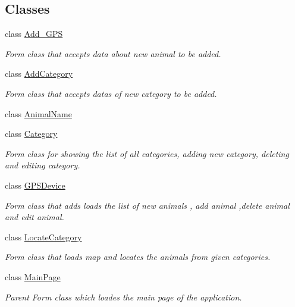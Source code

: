\subsection*{Classes}
\begin{DoxyCompactItemize}
\item 
class \hyperlink{classWildlifeTrackingApp_1_1Add__GPS}{Add\+\_\+\+G\+PS}
\begin{DoxyCompactList}\small\item\em Form class that accepts data about new animal to be added. \end{DoxyCompactList}\item 
class \hyperlink{classWildlifeTrackingApp_1_1AddCategory}{Add\+Category}
\begin{DoxyCompactList}\small\item\em Form class that accepts datas of new category to be added. \end{DoxyCompactList}\item 
class \hyperlink{classWildlifeTrackingApp_1_1AnimalName}{Animal\+Name}
\item 
class \hyperlink{classWildlifeTrackingApp_1_1Category}{Category}
\begin{DoxyCompactList}\small\item\em Form class for showing the list of all categories, adding new category, deleting and editing category. \end{DoxyCompactList}\item 
class \hyperlink{classWildlifeTrackingApp_1_1GPSDevice}{G\+P\+S\+Device}
\begin{DoxyCompactList}\small\item\em Form class that adds loads the list of new animals , add animal ,delete animal and edit animal. \end{DoxyCompactList}\item 
class \hyperlink{classWildlifeTrackingApp_1_1LocateCategory}{Locate\+Category}
\begin{DoxyCompactList}\small\item\em Form class that loads map and locates the animals from given categories. \end{DoxyCompactList}\item 
class \hyperlink{classWildlifeTrackingApp_1_1MainPage}{Main\+Page}
\begin{DoxyCompactList}\small\item\em Parent Form class which loades the main page of the application. \end{DoxyCompactList}\item 

\end{DoxyCompactItemize}

